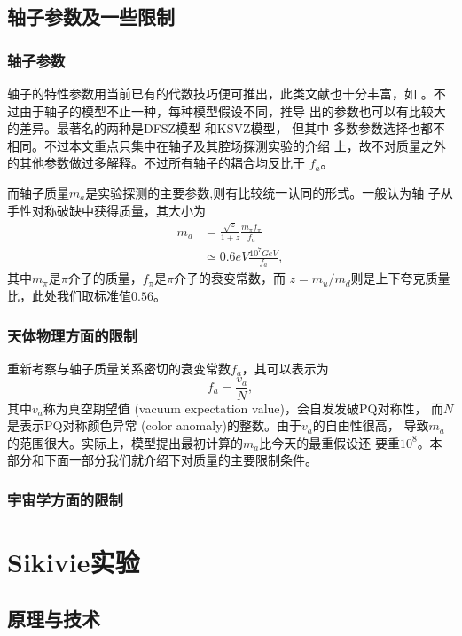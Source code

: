 \documentclass[twocolumn,12pt,a4paper]{article}
\begin{document}
\subsection{轴子参数及一些限制}
\subsubsection{轴子参数}
轴子的特性参数用当前已有的代数技巧便可推出，此类文献也十分丰富，如
\cite{weinberg78}。不过由于轴子的模型不止一种，每种模型假设不同，推导
出的参数也可以有比较大的差异。最著名的两种是DFSZ模型
\cite{zhitnitsky80}\cite{dine81}和KSVZ模型\cite{kim79}\cite{shifman80}，
但其中
多数参数选择也都不相同。不过本文重点只集中在轴子及其腔场探测实验的介绍
上，故不对质量之外的其他参数做过多解释。不过所有轴子的耦合均反比于
$f_a$。\par
而轴子质量$m_a$是实验探测的主要参数,则有比较统一认同的形式。一般认为轴
子从手性对称破缺中获得质量，其大小为
\begin{equation}
  \begin{split}
    m_a &= \frac{\sqrt{z}}{1+z}\frac{m_{\pi}f_{\pi}}{f_a} \\
        &\simeq 0.6 eV \frac{10^7GeV}{f_a},
  \end{split}
  \label{m:mass}
\end{equation}
其中$m_{\pi}$是$\pi$介子的质量，$f_{\pi}$是$\pi$介子的衰变常数，而
$z=m_u/m_d$则是上下夸克质量比，此处我们取标准值$0.56$。
\subsubsection{天体物理方面的限制}
重新考察与轴子质量关系密切的衰变常数$f_a$，其可以表示为
\begin{equation}
  f_a = \frac{v_a}{N},
  \label{m:fa}
\end{equation}
其中$v_a$称为真空期望值 (vacuum expectation value)，会自发发破PQ对称性，
而$N$是表示PQ对称颜色异常 (color anomaly)的整数。由于$v_a$的自由性很高，
导致$m_a$的范围很大。实际上，模型提出最初计算的$m_a$比今天的最重假设还
要重$10^8$。本部分和下面一部分我们就介绍下对质量的主要限制条件。\par
\subsubsection{宇宙学方面的限制}

\section{Sikivie实验}
\subsection{原理与技术}
\end{document}
